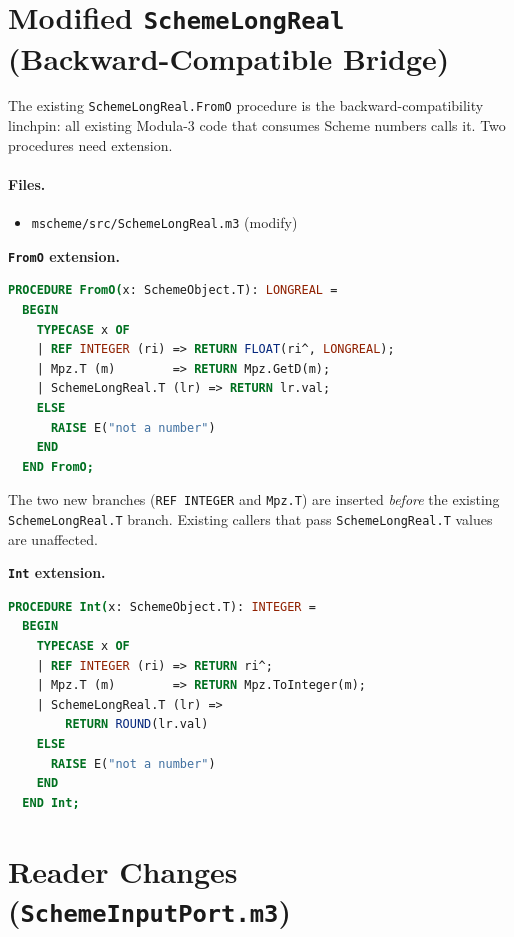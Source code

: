 \documentclass[12pt]{article}
\begin{document}
\section{Modified {\tt SchemeLongReal} (Backward-Compatible Bridge)}
\label{sec:impl-longreal}

The existing {\tt SchemeLongReal.FromO} procedure is the
backward-compatibility linchpin: all existing Modula-3 code that
consumes Scheme numbers calls it.  Two procedures need extension.

\paragraph{Files.}
\begin{itemize}[nosep]
\item {\tt mscheme/src/SchemeLongReal.m3} (modify)
\end{itemize}

\medskip\noindent\textbf{{\tt FromO} extension.}
\begin{lstlisting}[language=Modula3]
PROCEDURE FromO(x: SchemeObject.T): LONGREAL =
  BEGIN
    TYPECASE x OF
    | REF INTEGER (ri) => RETURN FLOAT(ri^, LONGREAL);
    | Mpz.T (m)        => RETURN Mpz.GetD(m);
    | SchemeLongReal.T (lr) => RETURN lr.val;
    ELSE
      RAISE E("not a number")
    END
  END FromO;
\end{lstlisting}

\noindent The two new branches ({\tt REF INTEGER} and {\tt Mpz.T})
are inserted \emph{before} the existing {\tt SchemeLongReal.T}
branch.  Existing callers that pass {\tt SchemeLongReal.T} values
are unaffected.

\medskip\noindent\textbf{{\tt Int} extension.}
\begin{lstlisting}[language=Modula3]
PROCEDURE Int(x: SchemeObject.T): INTEGER =
  BEGIN
    TYPECASE x OF
    | REF INTEGER (ri) => RETURN ri^;
    | Mpz.T (m)        => RETURN Mpz.ToInteger(m);
    | SchemeLongReal.T (lr) =>
        RETURN ROUND(lr.val)
    ELSE
      RAISE E("not a number")
    END
  END Int;
\end{lstlisting}

\section{Reader Changes ({\tt SchemeInputPort.m3})}
\label{sec:impl-reader}
\end{document}
